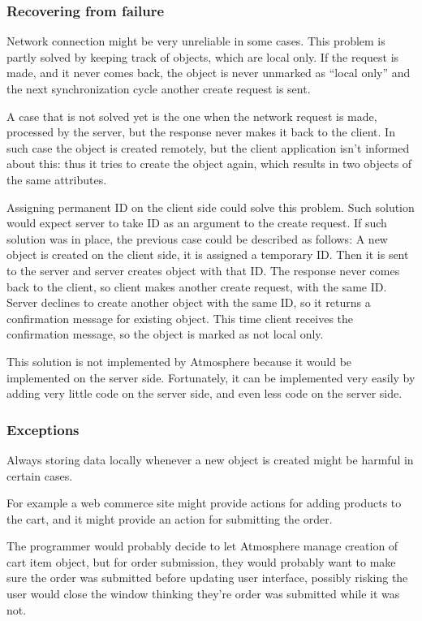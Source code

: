 \subsubsection{Recovering from failure}

Network connection might be very unreliable in some cases. This problem is partly solved by keeping track of objects, which are local only. If the request is made, and it never comes back, the object is never unmarked as “local only” and the next synchronization cycle another create request is sent. 

A case that is not solved yet is the one when the network request is made, processed by the server, but the response never makes it back to the client. In such case the object is created remotely, but the client application isn’t informed about this: thus it tries to create the object again, which results in two objects of the same attributes.

Assigning permanent ID on the client side could solve this problem. Such solution would expect server to take ID as an argument to the create request. If such solution was in place, the previous case could be described as follows: A new object is created on the client side, it is assigned a temporary ID. Then it is sent to the server and server creates object with that ID. The response never comes back to the client, so client makes another create request, with the same ID. Server declines to create another object with the same ID, so it returns a confirmation message for existing object. This time client receives the confirmation message, so the object is marked as not local only. 

This solution is not implemented by Atmosphere because it would be implemented on the server side. Fortunately, it can be implemented very easily by adding very little code on the server side, and even less code on the server side. 

\subsubsection{Exceptions}

Always storing data locally whenever a new object is created might be harmful in certain cases.

For example a web commerce site might provide actions for adding products to the cart, and it might provide an action for submitting the order.

The programmer would probably decide to let Atmosphere manage creation of cart item object, but for order submission, they would probably want to make sure the order was submitted before updating user interface, possibly risking the user would close the window thinking they’re order was submitted while it was not.

